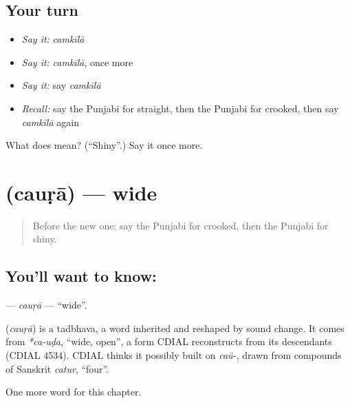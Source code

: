 \subsection*{Your turn}
\begin{itemize}
\raggedright
  \item \emph{Say it:} \emph{camkīlā}
  \item \emph{Say it:} \emph{camkīlā}, once more
  \item \emph{Say it:} say \emph{camkīlā}
  \item \emph{Recall:} say the Punjabi for straight, then the Punjabi for crooked, then say \emph{camkīlā} again
\end{itemize}

\begin{tcolorbox}[breakable,colback=teal!4,colframe=teal!35!black,title={Before you move on}]
What does  mean? (\textquotedblleft{}Shiny\textquotedblright{}.) Say it once more.
\end{tcolorbox}
\section[\texorpdfstring{\pa{ਚੌੜਾ} (cauṛā)}{ਚੌੜਾ (cauṛā)}]{ (cauṛā) — wide}

\label{lesson:PA-C142-caura}



\begin{quote}
Before the new one: say the Punjabi for crooked, then the Punjabi for shiny.
\end{quote}

\subsection*{You'll want to know: }
\textbf{} — \emph{cauṛā} — \textquotedblleft{}wide\textquotedblright{}.

\begin{cousinweb}
\textbf{} (\emph{cauṛā}) is a tadbhava, a word inherited and reshaped by sound change. It comes from \emph{*ca-uḍa}, \textquotedblleft{}wide, open\textquotedblright{}, a form CDIAL reconstructs from its descendants (CDIAL 4534). CDIAL thinks it possibly built on \emph{caü-}, drawn from compounds of Sanskrit \emph{catur}, \textquotedblleft{}four\textquotedblright{}.
\end{cousinweb}

\begin{grammarlens}[title={What you've built}]
One more word for this chapter.
\end{grammarlens}

